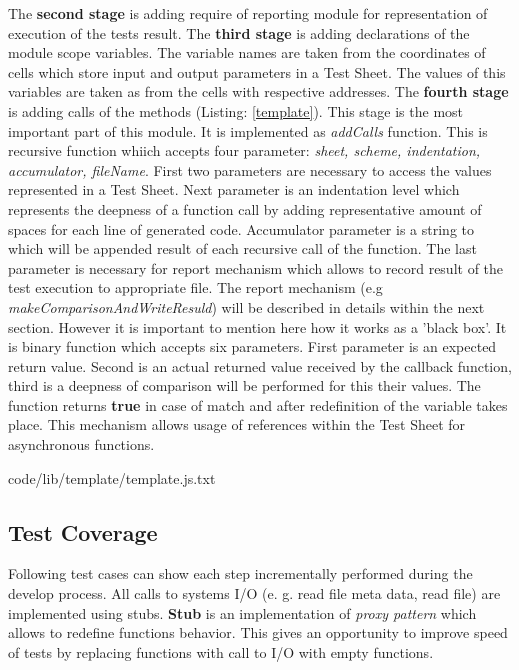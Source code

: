 The \textbf{second stage} is adding require of reporting module for representation of execution of the tests result.
The \textbf{third stage} is adding declarations of the module scope variables. The variable names are taken from the coordinates of cells which store input and output parameters in a Test Sheet. The values of this variables are taken as from the cells with respective addresses.
The \textbf{fourth stage} is adding calls of the methods (Listing: \ref{template}). This stage is the most important part of this module. It is implemented as \textit{addCalls} function. This is recursive function whiich accepts four parameter: \textit{sheet, scheme, indentation, accumulator, fileName}. First two parameters are necessary to access the values represented in a Test Sheet. Next parameter is an indentation level which represents the deepness of a function call by adding representative amount of spaces for each line of generated code. Accumulator parameter is a string to which will be appended result of each recursive call of the function. The last parameter is necessary for report mechanism which allows to record result of the test execution to appropriate file. The report mechanism (e.g \textit{makeComparisonAndWriteResuld}) will be described in details within  the next section. However it is important to mention here how it works as a 'black box'. It is binary function which accepts  six parameters. First parameter is an expected return value. Second is an actual returned value received by the callback function, third is a deepness of comparison will be performed for this their values. The function returns \textbf{true} in case of match and after redefinition of the variable takes place. This mechanism allows usage of references within the Test Sheet for asynchronous functions.

{code/lib/template/template.js.txt}




\subsection{Test Coverage}
Following test cases can show each step incrementally performed during the develop process. All calls to systems I/O (e. g. read file meta data, read file) are implemented using stubs. \textbf{Stub} is an implementation of \textit{proxy pattern} which allows to redefine functions behavior. This gives an opportunity to improve speed of tests by replacing functions with call to I/O with empty functions.

